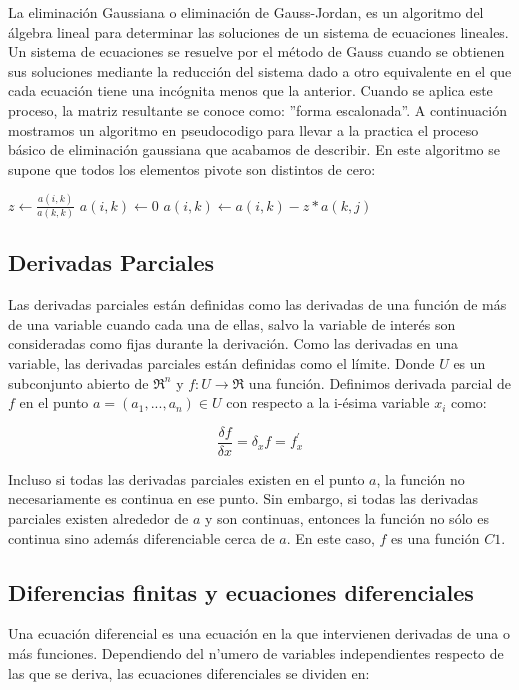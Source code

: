 \documentclass[a4paper]{article}
\begin{document}
La eliminación Gaussiana o eliminación de Gauss-Jordan, es un algoritmo del álgebra lineal para determinar las soluciones de un sistema de ecuaciones lineales. Un sistema de ecuaciones se resuelve por el método de Gauss cuando se obtienen sus soluciones mediante la reducción del sistema dado a otro equivalente en el que cada ecuación tiene una incógnita menos que la anterior. Cuando se aplica este proceso, la matriz resultante se conoce como: ”forma escalonada”. A continuación mostramos un algoritmo en pseudocodigo para llevar a la practica el proceso básico de eliminación gaussiana que acabamos de describir. En este algoritmo se supone que todos los elementos pivote son distintos de cero:


\begin{algorithmic}
\State $z\gets \frac{a(i,k)}{a(k,k)}$
\State $a(i,k) \gets 0$
\State $a(i,k) \gets a(i,k) - z*a(k,j)$
\EndFor
\EndFor
\EndFor
\end{algorithmic}

\subsection{Derivadas Parciales}
Las derivadas parciales están definidas como las derivadas de una función de más de una variable cuando cada una de ellas, salvo la variable de interés son consideradas como fijas durante la derivación.
Como las derivadas en una variable, las derivadas parciales están definidas como el límite. Donde $U$ es un subconjunto abierto de $\Re^n$ y $f : U \rightarrow \Re$ una función. Definimos derivada parcial de $f$ en el punto $a = (a_1,..., a_n) \in U$ con respecto a la i-ésima variable $x_i$ como:

\begin{equation*}
\frac{\delta f}{\delta x} = \delta_x f = f^{'}_x
\end{equation*}

Incluso si todas las derivadas parciales existen en el punto $a$, la función no necesariamente es continua en ese punto. Sin embargo, si todas las derivadas parciales existen alrededor de $a$ y son continuas, entonces la función no sólo es continua sino además diferenciable cerca de $a$. En este caso, $f$ es una función $C1$.

\subsection{Diferencias finitas y ecuaciones diferenciales}
Una ecuación diferencial es una ecuación en la que intervienen derivadas de una o más funciones. Dependiendo del n'umero de variables independientes respecto de las que se deriva, las ecuaciones diferenciales se dividen en:
\end{document}
